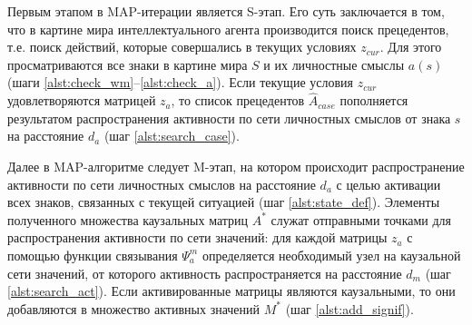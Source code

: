 \documentclass[12pt]{scrartcl}
\newcommand{\linesprval}{1}
\begin{document}
	Первым этапом в MAP-итерации является S-этап. Его суть заключается в том, что в картине мира интеллектуального агента производится поиск прецедентов, т.е. поиск действий, которые совершались в текущих условиях $z_{cur}$. Для этого просматриваются все знаки в картине мира $S$ и их личностные смыслы $a(s)$ (шаги \ref{alst:check_wm}--\ref{alst:check_a}). Если текущие условия $z_{cur}$ удовлетворяются матрицей $z_a$, то список прецедентов $\hat A_{case}$ пополняется результатом распространения активности по сети личностных смыслов от знака $s$ на расстояние $d_a$ (шаг \ref{alst:search_case}).
	\linespread{1}	
	\begin{algorithm}
		\begin{algorithmic}[1]
			
		\end{algorithmic}
	\end{algorithm}
	\linespread{\linesprval}

	Далее в MAP-алгоритме следует M-этап, на котором происходит распространение активности по сети личностных смыслов на расстояние $d_a$ с целью активации всех знаков, связанных с текущей ситуацией (шаг \ref{alst:state_def}). Элементы полученного множества каузальных матриц $A^*$ служат отправными точками для распространения активности по сети значений: для каждой матрицы $z_a$ с помощью функции связывания $\Psi_a^m$ определяется необходимый узел на каузальной сети значений, от которого активность распространяется на расстояние $d_m$ (шаг \ref{alst:search_act}). Если активированные матрицы являются каузальными, то они добавляются в множество активных значений $M^*$ (шаг \ref{alst:add_signif}).
	
	\linespread{1}	
	\begin{algorithm}
		\begin{algorithmic}[1]
			\algrestore{algst:store2}
			
			\algstore{algst:store3}
		\end{algorithmic}
	\end{algorithm}
	\linespread{\linesprval}
\end{document}
